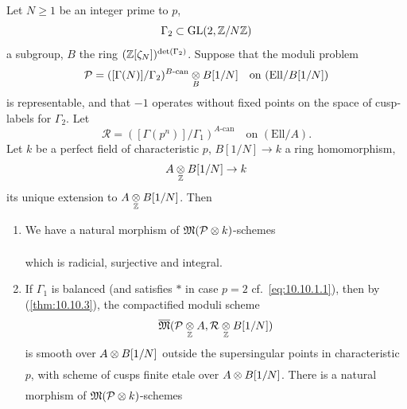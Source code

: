 \begin{kthm}\label{thm:13.10.4}
Let $N \ge 1$ be an integer prime to $p$,
\[
\Gamma_2 \subset \operatorname{GL}(2, \mathbb{Z}/N\mathbb{Z})
\]
a subgroup, $B$ the ring $(\mathbb{Z}[\zeta_N])^{\det(\Gamma_2)}$. Suppose that the moduli problem
\[
\mathcal{P} = ([\Gamma(N)]/\Gamma_2)^{B\text{-can}} \underset{B}{\otimes} B[1/N] \quad \text{on } (\mathrm{Ell}/B[1/N])
\]
is representable, and that $-1$ operates without fixed points on the space of cusp-labels for $\Gamma_2$. Let
\[
\mathcal{R} = ([\Gamma(p^n)]/\Gamma_1)^{A\text{-can}} \quad \text{on } (\mathrm{Ell}/A) .
\]
Let $k$ be a perfect field of characteristic $p$, $B[1/N] \to k$ a ring homomorphism,
\[
A \underset{\mathbb{Z}}{\otimes} B[1/N] \to k
\]
its unique extension to $A \underset{\mathbb{Z}}{\otimes} B[1/N]$. Then
\begin{enumerate}[label=(\arabic*), leftmargin=2.4em]
\item We have a natural morphism of $\mathfrak{M}(\mathcal{P} \underset{}{\otimes} k)$-schemes
\begin{center}
\end{center}
which is radicial, surjective and integral.
\item If $\Gamma_1$ is balanced (and satisfies $*$ in case $p = 2$ cf.\ \ref{eq:10.10.1.1}), then by (\ref{thm:10.10.3}), the compactified moduli scheme
\[
\overline{\mathfrak{M}}(\mathcal{P} \underset{\mathbb{Z}}{\otimes} A, \mathcal{R} \underset{\mathbb{Z}}{\otimes} B[1/N])
\]
is smooth over $A \underset{}{\otimes} B[1/N]$ outside the supersingular points in characteristic $p$, with scheme of cusps finite etale over $A \underset{}{\otimes} B[1/N]$. There is a natural morphism of $\mathfrak{M}(\mathcal{P} \underset{}{\otimes} k)$-schemes
\begin{center}
\end{center}
\end{enumerate}
\end{kthm}
